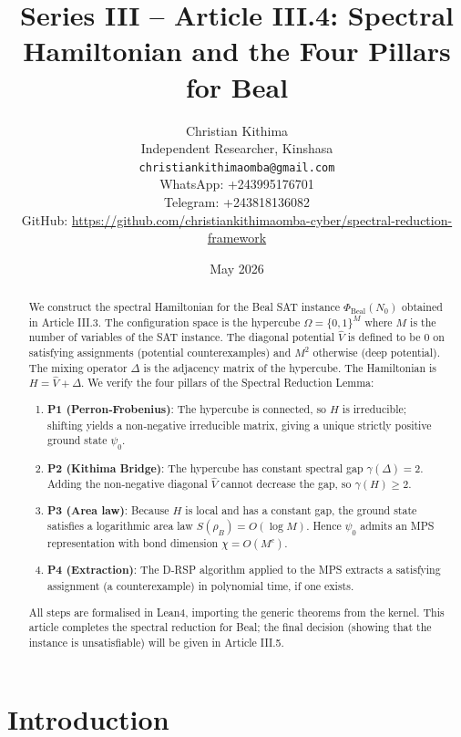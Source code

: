 \documentclass[11pt,a4paper]{article}
\title{Series III – Article III.4: Spectral Hamiltonian and the Four Pillars for Beal}
\author{Christian Kithima \\
Independent Researcher, Kinshasa \\
\texttt{christiankithimaomba@gmail.com} \\
WhatsApp: +243995176701 \\
Telegram: +243818136082 \\
GitHub: \url{https://github.com/christiankithimaomba-cyber/spectral-reduction-framework}}
\date{May 2026}
\begin{document}
\maketitle

\begin{abstract}
We construct the spectral Hamiltonian for the Beal SAT instance \(\Phi_{\text{Beal}}(N_0)\) obtained in Article III.3. The configuration space is the hypercube \(\Omega = \{0,1\}^M\) where \(M\) is the number of variables of the SAT instance. The diagonal potential \(\hat{V}\) is defined to be \(0\) on satisfying assignments (potential counterexamples) and \(M^2\) otherwise (deep potential). The mixing operator \(\Delta\) is the adjacency matrix of the hypercube. The Hamiltonian is \(H = \hat{V} + \Delta\). We verify the four pillars of the Spectral Reduction Lemma:
\begin{enumerate}
\item \textbf{P1 (Perron‑Frobenius)}: The hypercube is connected, so \(H\) is irreducible; shifting yields a non‑negative irreducible matrix, giving a unique strictly positive ground state \(\psi_0\).
\item \textbf{P2 (Kithima Bridge)}: The hypercube has constant spectral gap \(\gamma(\Delta)=2\). Adding the non‑negative diagonal \(\hat{V}\) cannot decrease the gap, so \(\gamma(H) \ge 2\).
\item \textbf{P3 (Area law)}: Because \(H\) is local and has a constant gap, the ground state satisfies a logarithmic area law \(S(\rho_B)=O(\log M)\). Hence \(\psi_0\) admits an MPS representation with bond dimension \(\chi = O(M^c)\).
\item \textbf{P4 (Extraction)}: The D‑RSP algorithm applied to the MPS extracts a satisfying assignment (a counterexample) in polynomial time, if one exists.
\end{enumerate}
All steps are formalised in Lean4, importing the generic theorems from the kernel. This article completes the spectral reduction for Beal; the final decision (showing that the instance is unsatisfiable) will be given in Article III.5.
\end{abstract}

\tableofcontents

\section{Introduction}
\end{document}
